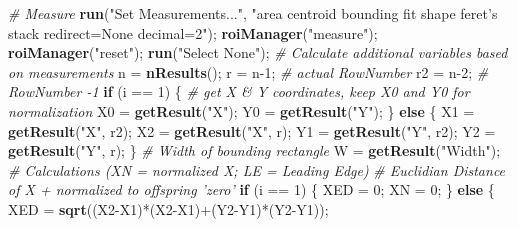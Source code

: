 \documentclass[11pt,singlespacinge,twoside]{reedthesis} %
\newenvironment{Shaded}{}{}
\newcommand{\CommentTok}[1]{\textit{#1}}
\newcommand{\ControlFlowTok}[1]{\textbf{#1}}
\newcommand{\DecValTok}[1]{#1}
\newcommand{\KeywordTok}[1]{\textbf{#1}}
\newcommand{\NormalTok}[1]{#1}
\newcommand{\OperatorTok}[1]{#1}
\newcommand{\StringTok}[1]{#1}
\theoremstyle{definition}
\theoremstyle{definition}
\theoremstyle{definition}
\theoremstyle{remark}
\begin{document}
\begin{Shaded}
\begin{Highlighting}[numbers=left,,]
     \CommentTok{# Measure}
        \KeywordTok{run}\NormalTok{(}\StringTok{"Set Measurements..."}\NormalTok{, }\StringTok{"area centroid bounding fit shape feret's stack redirect=None decimal=2"}\NormalTok{);}
        \KeywordTok{roiManager}\NormalTok{(}\StringTok{"measure"}\NormalTok{);}
        \KeywordTok{roiManager}\NormalTok{(}\StringTok{"reset"}\NormalTok{);}
        \KeywordTok{run}\NormalTok{(}\StringTok{"Select None"}\NormalTok{);}
    \CommentTok{# Calculate additional variables based on measurements}
\NormalTok{        n =}\StringTok{ }\KeywordTok{nResults}\NormalTok{();}
\NormalTok{        r =}\StringTok{ }\NormalTok{n}\DecValTok{-1}\NormalTok{;  }\CommentTok{# actual RowNumber}
\NormalTok{        r2 =}\StringTok{ }\NormalTok{n}\DecValTok{-2}\NormalTok{; }\CommentTok{# RowNumber -1}
        \ControlFlowTok{if}\NormalTok{ (i }\OperatorTok{==}\StringTok{ }\DecValTok{1}\NormalTok{) \{  }\CommentTok{# get X & Y coordinates, keep X0 and Y0 for normalization}
\NormalTok{            X0 =}\StringTok{ }\KeywordTok{getResult}\NormalTok{(}\StringTok{"X"}\NormalTok{);}
\NormalTok{            Y0 =}\StringTok{ }\KeywordTok{getResult}\NormalTok{(}\StringTok{"Y"}\NormalTok{);}
\NormalTok{        \} }\ControlFlowTok{else}\NormalTok{ \{}
\NormalTok{            X1 =}\StringTok{ }\KeywordTok{getResult}\NormalTok{(}\StringTok{"X"}\NormalTok{, r2);}
\NormalTok{            X2 =}\StringTok{ }\KeywordTok{getResult}\NormalTok{(}\StringTok{"X"}\NormalTok{, r);}
\NormalTok{            Y1 =}\StringTok{ }\KeywordTok{getResult}\NormalTok{(}\StringTok{"Y"}\NormalTok{, r2);}
\NormalTok{            Y2 =}\StringTok{ }\KeywordTok{getResult}\NormalTok{(}\StringTok{"Y"}\NormalTok{, r); }
\NormalTok{        \}}
    \CommentTok{# Width of bounding rectangle}
\NormalTok{        W =}\StringTok{ }\KeywordTok{getResult}\NormalTok{(}\StringTok{"Width"}\NormalTok{);}
    \CommentTok{# Calculations (XN = normalized X; LE = Leading Edge)}
    \CommentTok{# Euclidian Distance of X + normalized to offspring 'zero'}
        \ControlFlowTok{if}\NormalTok{ (i }\OperatorTok{==}\StringTok{ }\DecValTok{1}\NormalTok{) \{}
\NormalTok{            XED =}\StringTok{ }\DecValTok{0}\NormalTok{;}
\NormalTok{            XN =}\StringTok{ }\DecValTok{0}\NormalTok{;}
\NormalTok{        \} }\ControlFlowTok{else}\NormalTok{ \{}
\NormalTok{            XED =}\StringTok{ }\KeywordTok{sqrt}\NormalTok{((X2}\OperatorTok{-}\NormalTok{X1)}\OperatorTok{*}\NormalTok{(X2}\OperatorTok{-}\NormalTok{X1)}\OperatorTok{+}\NormalTok{(Y2}\OperatorTok{-}\NormalTok{Y1)}\OperatorTok{*}\NormalTok{(Y2}\OperatorTok{-}\NormalTok{Y1));}

\end{Highlighting}
\end{Shaded}
\end{document}
